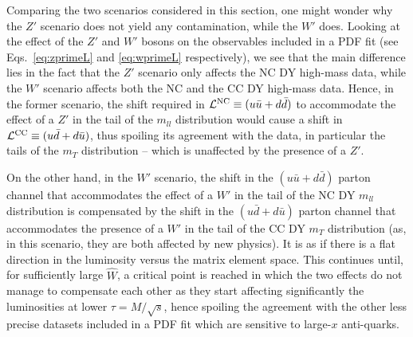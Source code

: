 \documentclass[withindex,glossary]{cam-thesis}
\begin{document}
Comparing the two scenarios considered in this section, one might wonder why 
the $Z'$ scenario does not yield any contamination, while the $W'$ does. 
%
%
Looking at the effect of the $Z'$ and $W'$ bosons on the observables included in a PDF fit (see Eqs.~\eqref{eq:zprimeL} and \eqref{eq:wprimeL} respectively), 
we see that the main difference lies in the fact that the $Z'$ scenario only affects the NC DY high-mass data, while the $W'$ scenario affects both the
NC and the CC DY high-mass data. Hence, in the former scenario, the shift required in ${\cal L}^{\rm NC}\equiv (u\bar{u}+d\bar{d})$ to accommodate the 
effect of a $Z'$ in the tail of the $m_{ll}$ distribution would cause a shift in ${\cal L}^{\rm CC}\equiv (u\bar{d}+d\bar{u})$, thus spoiling its agreement with the data, 
in particular the tails of the $m_T$ distribution -- which is unaffected by the presence of a $Z'$. 

On the other hand, in the $W'$ scenario, the shift in the $(u\bar{u}+d\bar{d})$ parton channel that accommodates the effect of a $W'$ in the tail of the 
NC DY $m_{ll}$ distribution is compensated by the shift in the $(u\bar{d}+d\bar{u})$ parton channel that accommodates the presence of a $W'$ in the tail of the 
CC DY $m_T$ distribution (as, in this scenario, they are both affected by new physics). It is as if there is a flat direction in the luminosity versus the 
matrix element space. This continues until, for sufficiently large $\hat{W}$, a critical 
point is reached in which the two effects do not manage to compensate each other as they start affecting significantly the luminosities at lower $\tau=M/\sqrt{s}$, 
hence spoiling the agreement with the other less precise datasets included in a PDF fit which are sensitive to large-$x$ anti-quarks. 
\end{document}
